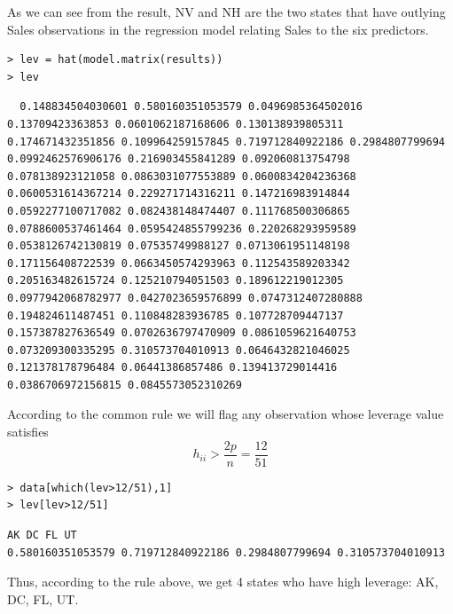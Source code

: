 \documentclass[letterpaper,11pt]{article}
\begin{document}
As we can see from the result, NV and NH are the two states that have outlying Sales observations in the regression model relating Sales to the six predictors.

\begin{lstlisting}
> lev = hat(model.matrix(results))
> lev
\end{lstlisting}

\begin{lstlisting}
  0.148834504030601 0.580160351053579 0.0496985364502016 0.13709423363853 0.0601062187168606 0.130138939805311 0.174671432351856 0.109964259157845 0.719712840922186 0.2984807799694 0.0992462576906176 0.216903455841289 0.092060813754798 0.078138923121058 0.0863031077553889 0.0600834204236368 0.0600531614367214 0.229271714316211 0.147216983914844 0.0592277100717082 0.082438148474407 0.111768500306865 0.0788600537461464 0.0595424855799236 0.220268293959589 0.0538126742130819 0.07535749988127 0.0713061951148198 0.171156408722539 0.0663450574293963 0.112543589203342 0.205163482615724 0.125210794051503 0.189612219012305 0.0977942068782977 0.0427023659576899 0.0747312407280888 0.194824611487451 0.110848283936785 0.107728709447137 0.157387827636549 0.0702636797470909 0.0861059621640753 0.073209300335295 0.310573704010913 0.0646432821046025 0.121378178796484 0.06441386857486 0.139413729014416 0.0386706972156815 0.0845573052310269
\end{lstlisting}

According to the common rule we will flag any observation whose leverage value satisfies
$$h_{ii} > \frac{2p}{n} = \frac{12}{51}$$

\begin{lstlisting}
> data[which(lev>12/51),1]
> lev[lev>12/51]
\end{lstlisting}

\begin{lstlisting}
AK DC FL UT
0.580160351053579 0.719712840922186 0.2984807799694 0.310573704010913
\end{lstlisting}

Thus, according to the rule above, we get 4 states who have high leverage: AK, DC, FL, UT.
\end{document}
